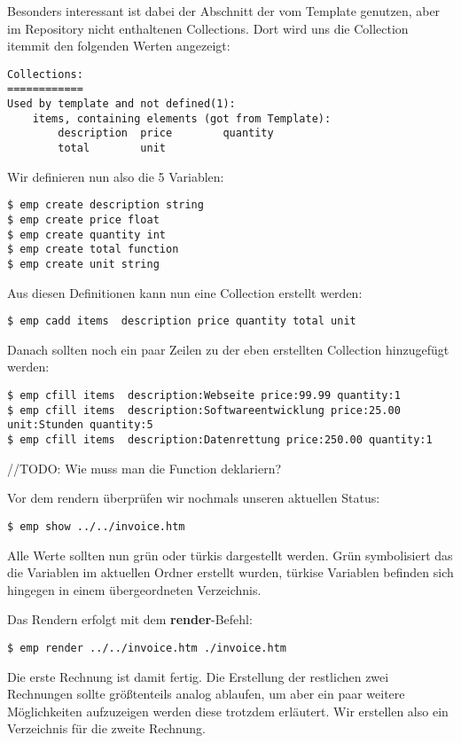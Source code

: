 Besonders interessant ist dabei der Abschnitt der vom Template genutzen, aber im Repository nicht enthaltenen Collections. Dort wird uns die Collection \grqq item\grqq mit den folgenden Werten angezeigt:

\begin{lstlisting}[style=Bash]
Collections:
============
Used by template and not defined(1):
	items, containing elements (got from Template):
		description  price        quantity
		total        unit
\end{lstlisting}

Wir definieren nun also die 5 Variablen:
\begin{lstlisting}[style=Bash]
$ emp create description string
$ emp create price float
$ emp create quantity int
$ emp create total function
$ emp create unit string
\end{lstlisting}

Aus diesen Definitionen kann nun eine Collection erstellt werden:
\begin{lstlisting}[style=Bash]
$ emp cadd items  description price quantity total unit
\end{lstlisting}

Danach sollten noch ein paar Zeilen zu der eben erstellten Collection hinzugefügt werden:
\begin{lstlisting}[style=Bash]
$ emp cfill items  description:Webseite price:99.99 quantity:1
$ emp cfill items  description:Softwareentwicklung price:25.00 unit:Stunden quantity:5
$ emp cfill items  description:Datenrettung price:250.00 quantity:1
\end{lstlisting}
//TODO: Wie muss man die Function deklariern?

Vor dem rendern überprüfen wir nochmals unseren aktuellen Status:
\begin{lstlisting}[style=Bash]
$ emp show ../../invoice.htm
\end{lstlisting}
Alle Werte sollten nun grün oder türkis dargestellt werden. Grün symbolisiert das die Variablen im aktuellen Ordner erstellt wurden, türkise Variablen befinden sich hingegen in einem übergeordneten Verzeichnis.

Das Rendern erfolgt mit dem \textbf{render}-Befehl:
\begin{lstlisting}[style=Bash]
$ emp render ../../invoice.htm ./invoice.htm
\end{lstlisting}

Die erste Rechnung ist damit fertig. Die Erstellung der restlichen zwei Rechnungen sollte größtenteils analog ablaufen, um aber ein paar weitere Möglichkeiten aufzuzeigen werden diese trotzdem erläutert.
Wir erstellen also ein Verzeichnis für die zweite Rechnung.

